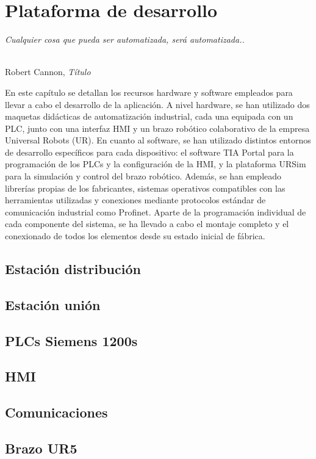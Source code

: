 \chapter{Plataforma de desarrollo}
\label{cap:capitulo3}

\begin{flushright}
\begin{minipage}[]{10cm}
\emph{Cualquier cosa que pueda ser automatizada, será automatizada..}\\
\end{minipage}\\

Robert Cannon, \textit{Título}\\
\end{flushright}

\vspace{1cm}

En este capítulo se detallan los recursos hardware y software empleados para llevar a cabo el desarrollo de la aplicación. A nivel hardware, se han utilizado dos maquetas didácticas de automatización industrial, cada una equipada con un PLC, junto con una interfaz HMI y un brazo robótico colaborativo de la empresa Universal Robots (UR). En cuanto al software, se han utilizado distintos entornos de desarrollo específicos para cada dispositivo: el software TIA Portal para la programación de los PLCs y la configuración de la HMI, y la plataforma URSim para la simulación y control del brazo robótico. Además, se han empleado librerías propias de los fabricantes, sistemas operativos compatibles con las herramientas utilizadas y conexiones mediante protocolos estándar de comunicación industrial como Profinet. Aparte de la programación individual de cada componente del sistema, se ha llevado a cabo el montaje completo y el conexionado de todos los elementos desde su estado inicial de fábrica.

\section{Estación distribución}

\section{Estación unión}

\section{PLCs Siemens 1200s}

\section{HMI}

\section{Comunicaciones}

\section{Brazo UR5}





